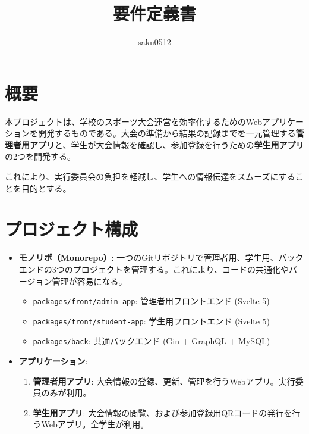 \documentclass[12pt]{ltjsarticle} %
\title{要件定義書}
\author{saku0512}
\date{}
\begin{document}
\maketitle

\setcounter{tocdepth}{3}
\tableofcontents %

\newpage

\section{概要}

本プロジェクトは、学校のスポーツ大会運営を効率化するためのWebアプリケーションを開発するものである。大会の準備から結果の記録までを一元管理する\textbf{管理者用アプリ}と、学生が大会情報を確認し、参加登録を行うための\textbf{学生用アプリ}の2つを開発する。

これにより、実行委員会の負担を軽減し、学生への情報伝達をスムーズにすることを目的とする。

\section{プロジェクト構成}

\begin{itemize}
    \item \textbf{モノリポ（Monorepo）}: 一つのGitリポジトリで管理者用、学生用、バックエンドの3つのプロジェクトを管理する。これにより、コードの共通化やバージョン管理が容易になる。
        \begin{itemize}
            \item \texttt{packages/front/admin-app}: 管理者用フロントエンド (Svelte 5)
            \item \texttt{packages/front/student-app}: 学生用フロントエンド (Svelte 5)
            \item \texttt{packages/back}: 共通バックエンド (Gin + GraphQL + MySQL)
        \end{itemize}
    \item \textbf{アプリケーション}:
        \begin{enumerate}
            \item \textbf{管理者用アプリ}: 大会情報の登録、更新、管理を行うWebアプリ。実行委員のみが利用。
            \item \textbf{学生用アプリ}: 大会情報の閲覧、および参加登録用QRコードの発行を行うWebアプリ。全学生が利用。
        \end{enumerate}
\end{itemize}
\end{document}
